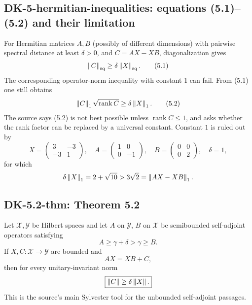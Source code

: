 \subsection*{DK-5-hermitian-inequalities: equations (5.1)--(5.2) and their limitation}
For Hermitian matrices $A,B$ (possibly of different dimensions) with pairwise spectral distance at least $\delta>0$, and $C=AX-XB$, diagonalization gives
\begin{equation}
 \left\lVert C\right\rVert_{\mathrm{sq}}\ge\delta\left\lVert X\right\rVert_{\mathrm{sq}}.
 \tag{5.1}
\end{equation}
The corresponding operator-norm inequality with constant $1$ can fail.  From (5.1) one still obtains
\begin{equation}
 \left\lVert C\right\rVert_1\sqrt{\operatorname{rank}C}\ge\delta\left\lVert X\right\rVert_1.
 \tag{5.2}
\end{equation}
The source says (5.2) is not best possible unless $\operatorname{rank}C\le1$, and asks whether the rank factor can be replaced by a universal constant.  Constant $1$ is ruled out by
\[
 X=\begin{pmatrix}3&-3\\-3&1\end{pmatrix},\quad
 A=\begin{pmatrix}1&0\\0&-1\end{pmatrix},\quad
 B=\begin{pmatrix}0&0\\0&2\end{pmatrix},\quad \delta=1,
\]
for which
\[
 \delta\left\lVert X\right\rVert_1=2+\sqrt{10}>3\sqrt2=\left\lVert AX-XB\right\rVert_1.
\]

\subsection*{DK-5.2-thm: Theorem 5.2}
Let $\mathcal X,\mathcal Y$ be Hilbert spaces and let $A$ on $\mathcal Y$, $B$ on $\mathcal X$ be semibounded self-adjoint operators satisfying
\[
 A\ge\gamma+\delta>\gamma\ge B.
\]
If $X,C:\mathcal X\to\mathcal Y$ are bounded and
\[
 AX=XB+C,
\]
then for every unitary-invariant norm
\[
 \boxed{\left\lVert C\right\rVert\ge\delta\left\lVert X\right\rVert.}
\]
This is the source's main Sylvester tool for the unbounded self-adjoint passages.

